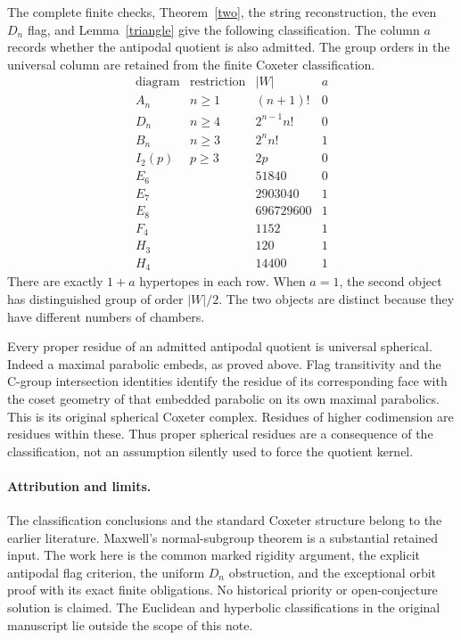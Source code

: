 \documentclass[11pt,a4paper]{article}
\begin{document}
The complete finite checks, Theorem~\ref{two}, the string reconstruction,
the even $D_n$ flag, and Lemma~\ref{triangle} give the following classification.
The column $a$ records whether the antipodal quotient is also admitted.
The group orders in the universal column are retained from the finite
Coxeter classification.
\[
\begin{array}{c|c|r|c}
\text{diagram}&\text{restriction}&|W|&a\\\hline
A_n&n\geq1&(n+1)!&0\\
D_n&n\geq4&2^{n-1}n!&0\\
B_n&n\geq3&2^nn!&1\\
I_2(p)&p\geq3&2p&0\\
E_6&&51840&0\\
E_7&&2903040&1\\
E_8&&696729600&1\\
F_4&&1152&1\\
H_3&&120&1\\
H_4&&14400&1
\end{array}
\]
There are exactly $1+a$ hypertopes in each row. When $a=1$, the second
object has distinguished group of order $|W|/2$. The two objects are
distinct because they have different numbers of chambers.

Every proper residue of an admitted antipodal quotient is universal
spherical. Indeed a maximal parabolic embeds, as proved above. Flag
transitivity and the C-group intersection identities identify the residue
of its corresponding face with the coset geometry of that embedded
parabolic on its own maximal parabolics. This is its original spherical
Coxeter complex. Residues of higher codimension are residues within these.
Thus proper spherical residues are a consequence of the classification,
not an assumption silently used to force the quotient kernel.

\paragraph{Attribution and limits.}
The classification conclusions and the standard Coxeter structure belong
to the earlier literature. Maxwell's normal-subgroup theorem is a substantial
retained input. The work here is the common marked rigidity argument, the
explicit antipodal flag criterion, the uniform $D_n$ obstruction, and the
exceptional orbit proof with its exact finite obligations. No historical
priority or open-conjecture solution is claimed. The Euclidean and hyperbolic
classifications in the original manuscript lie outside the scope of this note.
\end{document}
